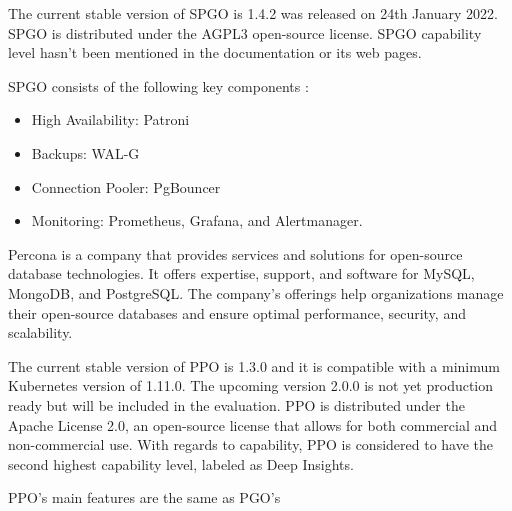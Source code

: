 The current stable version of SPGO is 1.4.2 was released on 24th January 2022. \cite{ SPGOgitlabChangelog} SPGO is distributed under the AGPL3 open-source license. \cite{SPGODocuLicence} SPGO capability level hasn’t been mentioned in the documentation or its web pages.

SPGO consists of the following key components \cite{PostgresOnKubernetes}:
\begin{itemize}
  \item High Availability: Patroni
  \item Backups: WAL-G
  \item Connection Pooler: PgBouncer
  \item Monitoring: Prometheus, Grafana, and Alertmanager.
\end{itemize}



\pagebreak
{}
Percona is a company that provides services and solutions for open-source database technologies. It offers expertise, support, and software for MySQL, MongoDB, and PostgreSQL. The company's offerings help organizations manage their open-source databases and ensure optimal performance, security, and scalability. \cite{Percona}

The current stable version of PPO is 1.3.0 and it is compatible with a minimum Kubernetes version of 1.11.0. The upcoming version 2.0.0 is not yet production ready but will be included in the evaluation. PPO is distributed under the Apache License 2.0, an open-source license that allows for both commercial and non-commercial use. With regards to capability, PPO is considered to have the second highest capability level, labeled as Deep Insights. \cite{OperatorHubPercona}

PPO’s main features are the same as PGO’s \cite{OperatorHubPercona}



